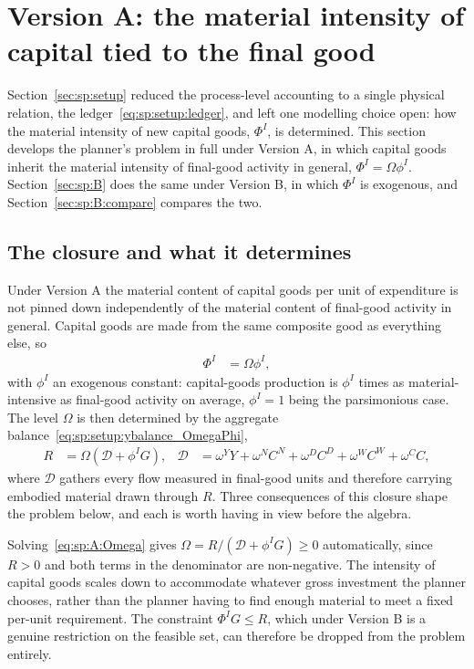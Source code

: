 ﻿\section{Version A: the material intensity of capital tied to the final good}\label{sec:sp:A}

Section~\ref{sec:sp:setup} reduced the process-level accounting to a single physical relation, the
ledger~\eqref{eq:sp:setup:ledger}, and left one modelling choice open: how the material intensity of
new capital goods, $\Phi^I$, is determined. This section develops the planner's problem in full under
Version A, in which capital goods inherit the material intensity of final-good activity in general,
$\Phi^I=\Omega\phi^I$. Section~\ref{sec:sp:B} does the same under Version B, in which $\Phi^I$ is
exogenous, and Section~\ref{sec:sp:B:compare} compares the two.


\subsection{The closure and what it determines}\label{sec:sp:A:closure}

Under Version A the material content of capital goods per unit of expenditure is not pinned down
independently of the material content of final-good activity in general. Capital goods are made from
the same composite good as everything else, so
\begin{align}
\Phi^I &= \Omega\phi^I,
\label{eq:sp:A:closure}
\end{align}
with $\phi^I$ an exogenous constant: capital-goods production is $\phi^I$ times as material-intensive
as final-good activity on average, $\phi^I=1$ being the parsimonious case. The level $\Omega$ is then
determined by the aggregate balance~\eqref{eq:sp:setup:ybalance_OmegaPhi},
\begin{align}
R &= \Omega\left(\mathcal D+\phi^IG\right),
&
\mathcal D &= \omega^YY+\omega^{N}C^N+\omega^{D}C^D+\omega^WC^W+\omega^CC,
\label{eq:sp:A:Omega}
\end{align}
where $\mathcal D$ gathers every flow measured in final-good units and therefore carrying embodied
material drawn through $R$. Three consequences of this closure shape the problem below, and each is
worth having in view before the algebra.

 Solving~\eqref{eq:sp:A:Omega} gives
$\Omega=R/\left(\mathcal D+\phi^IG\right)\ge0$ automatically, since $R>0$ and both terms in the
denominator are non-negative. The intensity of capital goods scales down to accommodate whatever
gross investment the planner chooses, rather than the planner having to find enough material to meet
a fixed per-unit requirement. The constraint $\Phi^IG\le R$, which under Version B is a genuine
restriction on the feasible set, can therefore be dropped from the problem entirely.

